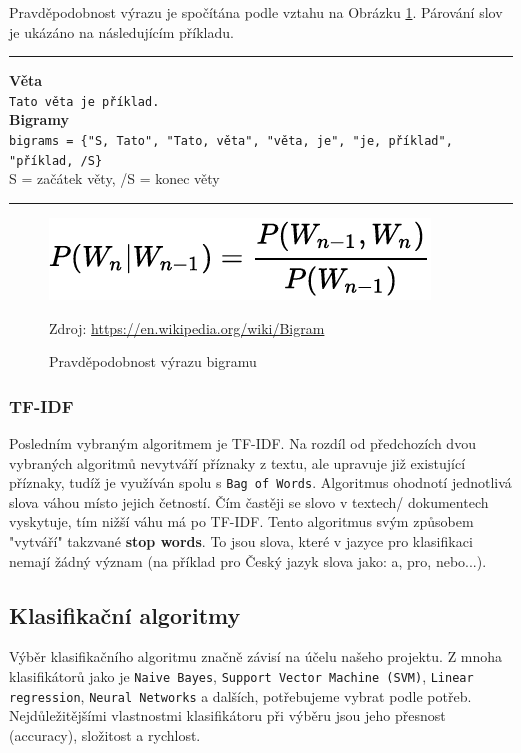 \documentclass[12pt]{article}
\begin{document}
Pravděpodobnost výrazu je spočítána podle vztahu na Obrázku
\ref{fig:bigram_prob}.
Párování slov je ukázáno na následujícím příkladu.\\
\rule{\textwidth}{0.4pt}
	\textbf{Věta}\\
	\texttt{Tato věta je příklad.}\\

	\noindent\textbf{Bigramy}\\
	\texttt{bigrams = \{"S, Tato", "Tato, věta", "věta, je", "je, příklad",\\ "příklad, /S\}}\\

	\noindent S = začátek věty,
	/S = konec věty\\
\rule{\textwidth}{0.4pt}
\begin{figure}[H]
        \centering
        \includegraphics[]{img/bigram_prob.pdf}
        \caption{Pravděpodobnost výrazu bigramu}
        Zdroj: \url{https://en.wikipedia.org/wiki/Bigram}
        \label{fig:bigram_prob}
\end{figure}
\subsubsection{TF-IDF}
Posledním vybraným algoritmem je TF-IDF. Na rozdíl od předchozích dvou
vybraných algoritmů nevytváří příznaky z textu, ale upravuje již 
existující příznaky, tudíž je využíván spolu s \texttt{Bag of Words}.
Algoritmus ohodnotí jednotlivá slova váhou místo jejich četností.
Čím častěji se slovo v textech/ dokumentech vyskytuje, tím nižší váhu
má po TF-IDF. Tento algoritmus svým způsobem "vytváří" takzvané 
\textbf{stop words}. To jsou slova, které v jazyce pro klasifikaci
nemají žádný význam (na příklad pro Český jazyk slova jako: a, pro, 
nebo...).
%
\subsection{Klasifikační algoritmy}
Výběr klasifikačního algoritmu značně závisí na účelu našeho 
projektu. Z mnoha klasifikátorů jako je \texttt{Naive Bayes},
\texttt{Support Vector Machine (SVM)}, \texttt{Linear regression},
\texttt{Neural Networks} a dalších, potřebujeme vybrat podle potřeb.
Nejdůležitějšími vlastnostmi klasifikátoru při výběru jsou jeho 
přesnost (accuracy), složitost a rychlost.
\end{document}
